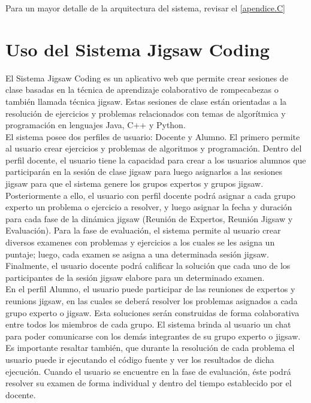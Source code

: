 Para un mayor detalle de la arquitectura del sistema, revisar el \autoref{apendice.C}

\section{Uso del Sistema Jigsaw Coding} 
El Sistema Jigsaw Coding es un aplicativo web que permite crear sesiones de clase basadas en la técnica de aprendizaje colaborativo de rompecabezas o también llamada técnica jigsaw. Estas sesiones de clase están orientadas a la resolución de ejercicios y problemas relacionados con temas de algorítmica y programación en lenguajes Java, C++ y Python.\\

El sistema posee dos perfiles de usuario: Docente y Alumno. El primero permite al usuario crear ejercicios y problemas de algoritmos y programación. Dentro del perfil docente, el usuario tiene la capacidad para crear a los usuarios alumnos que participarán en la sesión de clase jigsaw para luego asignarlos a las sesiones jigsaw para que el sistema genere los grupos expertos y grupos jigsaw. Posteriormente a ello, el usuario con perfil docente podrá asignar a cada grupo experto un problema o ejercicio a resolver, y luego asignar la fecha y duración para cada fase de la dinámica jigsaw (Reunión de Expertos, Reunión Jigsaw y Evaluación). Para la fase de evaluación, el sistema permite al usuario crear diversos examenes con problemas y ejercicios a los cuales se les asigna un puntaje; luego, cada examen se asigna a una determinada sesión jigsaw. Finalmente, el usuario docente podrá calificar la solución que cada uno de los participantes de la sesión jigsaw elabore para un determinado examen.\\

En el perfil Alumno, el usuario puede participar de las reuniones de expertos y reunions jigsaw, en las cuales se deberá resolver los problemas asignados a cada grupo experto o jigsaw. Esta soluciones serán construidas de forma colaborativa entre todos los miembros de cada grupo. El sistema brinda al usuario un chat para poder comunicarse con los demás integrantes de su grupo experto o jigsaw. Es importante resaltar también, que durante la resolución de cada problema el usuario puede ir ejecutando el código fuente y ver los resultados de dicha ejecución. Cuando el usuario se encuentre en la fase de evaluación, éste podrá resolver su examen de forma individual y dentro del tiempo establecido por el docente.\\

